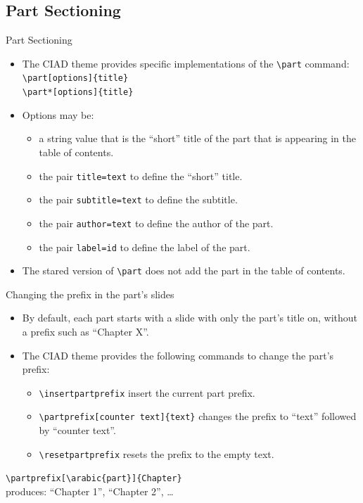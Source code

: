 \documentclass[english,sectioncirclenumberstyle]{ciadbeamer}
\begin{document}
\subsection{Part Sectioning}

\begin{frame}{Part Sectioning}
	\begin{itemize}
	\item The CIAD theme provides specific implementations of the \texttt{{\textbackslash}part} command: \\
		\texttt{{\textbackslash}part[options]\{title\}} \\
		\texttt{{\textbackslash}part*[options]\{title\}}
	\vfill
	\item Options may be: \begin{itemize}
		\item a string value that is the ``short'' title of the part that is appearing in the table of contents.
		\item the pair \texttt{title=text} to define the ``short'' title.
		\item the pair \texttt{subtitle=text} to define the subtitle.
		\item the pair \texttt{author=text} to define the author of the part.
		\item the pair \texttt{label=id} to define the label of the part.
		\end{itemize}
	\vfill
	\item The stared version of \texttt{{\textbackslash}part} does not add the part in the table of contents.
	\end{itemize}
\end{frame}

\begin{frame}{{Changing the prefix} in the part's slides}
	\begin{itemize}
	\item By default, each part starts with a slide with only the part's title on, without a prefix such as ``Chapter X''.
	\vfill
	\item The CIAD theme provides the following commands to change the part's prefix:
		\begin{itemize}
		\item \texttt{{\textbackslash}insertpartprefix} insert the current part prefix.
		\item \texttt{{\textbackslash}partprefix[counter text]\{text\}} changes the prefix to ``text'' followed by ``counter text''.
		\item \texttt{{\textbackslash}resetpartprefix} resets the prefix to the empty text.
		\end{itemize}
	\end{itemize}
	\vfill
	\begin{example}
		\texttt{{\textbackslash}partprefix[{\textbackslash}arabic\{part\}]\{Chapter\}} \\
		produces: ``Chapter 1'', ``Chapter 2'', \dots
	\end{example}
\end{frame}
\end{document}
